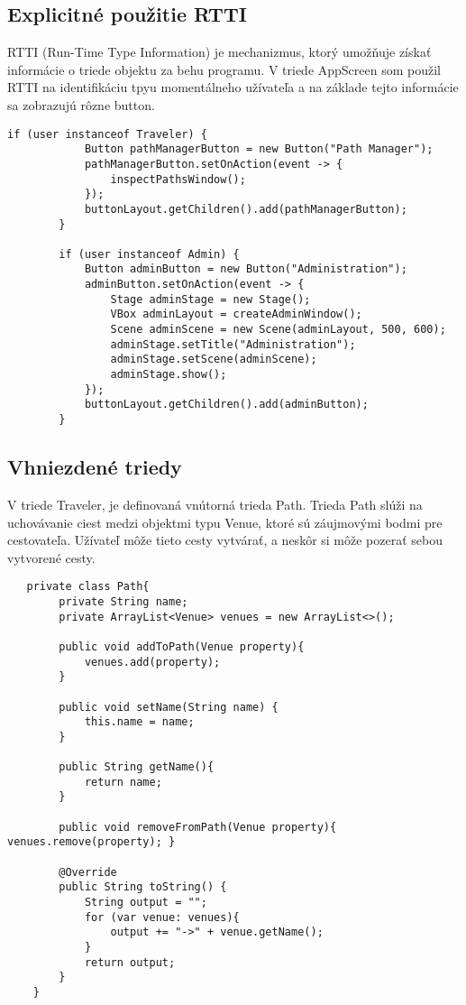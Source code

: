 \documentclass{article}
\begin{document}
\subsection{Explicitné použitie RTTI}
RTTI (Run-Time Type Information) je mechanizmus, ktorý umožňuje získať informácie o triede objektu za behu programu. V triede AppScreen som použil RTTI na identifikáciu tpyu momentálneho užívateľa a na základe tejto informácie sa zobrazujú rôzne button.
\begin{verbatim}
if (user instanceof Traveler) {
            Button pathManagerButton = new Button("Path Manager");
            pathManagerButton.setOnAction(event -> {
                inspectPathsWindow();
            });
            buttonLayout.getChildren().add(pathManagerButton);
        }

        if (user instanceof Admin) {
            Button adminButton = new Button("Administration");
            adminButton.setOnAction(event -> {
                Stage adminStage = new Stage();
                VBox adminLayout = createAdminWindow();
                Scene adminScene = new Scene(adminLayout, 500, 600);
                adminStage.setTitle("Administration");
                adminStage.setScene(adminScene);
                adminStage.show();
            });
            buttonLayout.getChildren().add(adminButton);
        }
\end{verbatim}

\subsection{Vhniezdené triedy}
V triede Traveler, je definovaná vnútorná trieda Path. Trieda Path slúži na uchovávanie ciest medzi objektmi typu Venue, ktoré sú záujmovými bodmi pre cestovateľa. Užívateľ môže tieto cesty vytvárať, a neskôr si môže pozerať sebou vytvorené cesty.
\begin{verbatim}
   private class Path{
        private String name;
        private ArrayList<Venue> venues = new ArrayList<>();

        public void addToPath(Venue property){
            venues.add(property);
        }

        public void setName(String name) {
            this.name = name;
        }

        public String getName(){
            return name;
        }

        public void removeFromPath(Venue property){ venues.remove(property); }

        @Override
        public String toString() {
            String output = "";
            for (var venue: venues){
                output += "->" + venue.getName();
            }
            return output;
        }
    } 
\end{verbatim}
\end{document}

